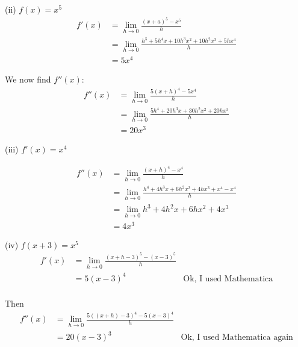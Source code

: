 \vs

(ii) $f(x)=x^5$
\begin{align*}
  f'(x)&=\lim_{h\to0}\frac{(x+a)^5-x^5}{h}\\
       &=\lim_{h\to0}\frac{h^5 + 5 h^4 x + 10 h^3 x^2 + 10 h^2 x^3 + 5
  h x^4}{h}\\
       &=5x^4
\end{align*}

We now find $f''(x)$:
\begin{align*}
  f''(x)&=\lim_{h\to0}\frac{5(x+h)^4-5x^4}{h}\\
        &=\lim_{h\to0}\frac{5 h^4 + 20 h^3 x + 30 h^2 x^2 + 20 h
          x^3}{h}\\
        &=20x^3
\end{align*}

\vs

(iii) $f'(x)=x^4$

\begin{align*}
  f''(x)&=\lim_{h\to0}\frac{(x+h)^4-x^4}{h}\\
        &=\lim_{h\to0}\frac{h^4+4h^3x+6h^2x^2+4hx^3+x^4-x^4}{h}\\
        &=\lim_{h\to0}h^3+4h^2x+6hx^2+4x^3\\
        &=4x^3
\end{align*}

\vs

(iv) $f(x+3)=x^5$
\begin{align*}
  f'(x)&=\lim_{h\to0}\frac{(x+h-3)^5-(x-3)^5}{h}\\
       &=5(x-3)^4&\text{Ok, I used Mathematica}\\
\end{align*}

Then
\begin{align*}
  f''(x)&=\lim_{h\to0}\frac{5((x+h)-3)^4-5(x-3)^4}{h}\\
        &=20(x-3)^3&\text{Ok, I used Mathematica again}
\end{align*}


